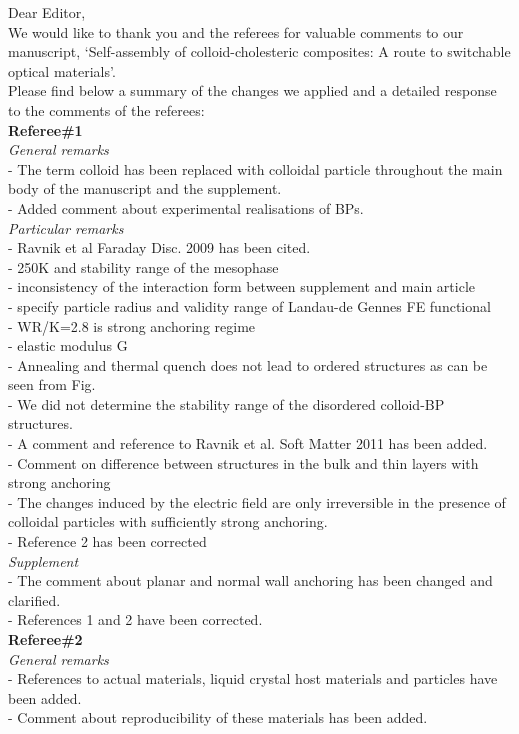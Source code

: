 \documentclass[12pt]{article}
\begin{document}
Dear Editor,\\

We would like to thank you and the referees for valuable comments to our 
manuscript, `Self-assembly of colloid-cholesteric composites: A 
route to switchable optical materials'. \\

Please find below a summary of the changes we applied and a detailed
response to the comments of the referees:\\

{\bf Referee\#1}\\

{\it General remarks}\\
- The term colloid has been replaced with colloidal particle throughout the main body of the manuscript and the supplement.\\
- Added comment about experimental realisations of BPs.\\

{\it Particular remarks}\\
- Ravnik et al Faraday Disc. 2009 has been cited.\\
- 250K and stability range of the mesophase\\
- inconsistency of the interaction form between supplement and main article\\
- specify particle radius and validity range of Landau-de Gennes FE functional\\
- WR/K=2.8 is strong anchoring regime\\
- elastic modulus G\\
- Annealing and thermal quench does not lead to ordered structures as can be seen from Fig.\\
- We did not determine the stability range of the disordered colloid-BP structures.\\
- A comment and reference to Ravnik et al. Soft Matter 2011 has been added.\\
- Comment on difference between structures in the bulk and thin layers with strong anchoring\\
- The changes induced by the electric field are only irreversible in the presence of colloidal particles with sufficiently strong anchoring.\\
- Reference 2 has been corrected\\

{\it Supplement}\\
- The comment about planar and normal wall anchoring has been changed and clarified.\\
- References 1 and 2 have been corrected.\\

{\bf Referee\#2}\\

{\it General remarks}\\
- References to actual materials, liquid crystal host materials and particles have been added.\\
- Comment about reproducibility of these materials has been added.\\
\end{document}
